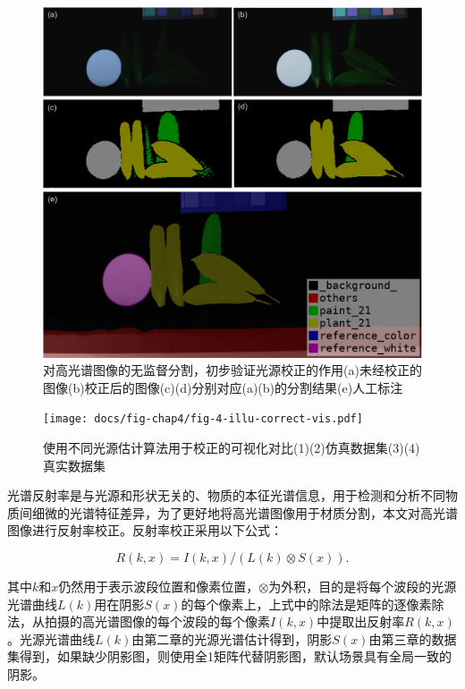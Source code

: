 \documentclass[
    type = master, %
    degree = academic,        %
    decl-page,  %
  ]{njuthesis}
\begin{document}
\begin{figure}[h]
	\centering
	\includegraphics[width=0.8\linewidth]{docs/fig-chap4/fig-4-illu-correct-seg.pdf}
	\caption{对高光谱图像的无监督分割，初步验证光源校正的作用\quad (a)未经校正的图像\quad (b)校正后的图像\quad (c)(d)分别对应(a)(b)的分割结果\quad (e)人工标注\quad }
	\label{fig:illu correct seg}
\end{figure}
\begin{figure}[h]
	\centering
	\texttt{[image: docs/fig-chap4/fig-4-illu-correct-vis.pdf]}
	\caption{使用不同光源估计算法用于校正的可视化对比\quad (1)(2)仿真数据集\quad (3)(4)真实数据集}
	\label{fig:illu correct vis}
\end{figure}

光谱反射率是与光源和形状无关的、物质的本征光谱信息，用于检测和分析不同物质间细微的光谱特征差异，为了更好地将高光谱图像用于材质分割，本文对高光谱图像进行反射率校正。反射率校正采用以下公式：

\begin{equation}
\label{eq:reflectance}
    R(k, x) = I(k, x)/\left(L(k)\otimes S(x)\right).
\end{equation}

其中$k$和$x$仍然用于表示波段位置和像素位置，$\otimes$为外积，目的是将每个波段的光源光谱曲线$L(k)$用在阴影$S(x)$的每个像素上，上式中的除法是矩阵的逐像素除法，从拍摄的高光谱图像的每个波段的每个像素$I(k, x)$中提取出反射率$R(k, x)$。光源光谱曲线$L(k)$由第二章的光源光谱估计得到，阴影$S(x)$由第三章的数据集得到，如果缺少阴影图，则使用全1矩阵代替阴影图，默认场景具有全局一致的阴影。
\end{document}
